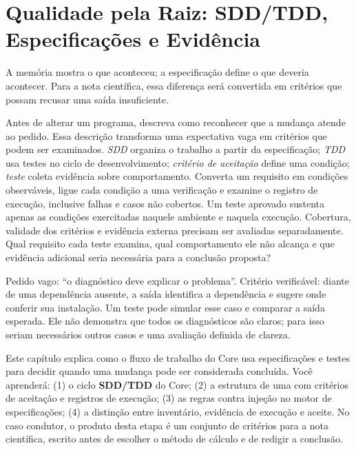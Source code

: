 \thispagestyle{fancy}
\chapter{Qualidade pela Raiz: SDD/TDD, Especificações e Evidência}

A memória mostra o que aconteceu; a especificação define o que deveria acontecer. Para a nota científica, essa diferença será convertida em critérios que possam recusar uma saída insuficiente.


\roteirodidatico
{Antes de alterar um programa, descreva como reconhecer que a mudança atende ao pedido. Essa descrição transforma uma expectativa vaga em critérios que podem ser examinados.}
{\emph{SDD} organiza o trabalho a partir da especificação; \emph{TDD} usa testes no ciclo de desenvolvimento; \emph{critério de aceitação} define uma condição; \emph{teste} coleta evidência sobre comportamento.}
{Converta um requisito em condições observáveis, ligue cada condição a uma verificação e examine o registro de execução, inclusive falhas e casos não cobertos.}
{Um teste aprovado sustenta apenas as condições exercitadas naquele ambiente e naquela execução. Cobertura, validade dos critérios e evidência externa precisam ser avaliadas separadamente.}
{Qual requisito cada teste examina, qual comportamento ele não alcança e que evidência adicional seria necessária para a conclusão proposta?}

{Pedido vago: ``o diagnóstico deve explicar o problema''. Critério verificável: diante de uma dependência ausente, a saída identifica a dependência e sugere onde conferir sua instalação. Um teste pode simular esse caso e comparar a saída esperada. Ele não demonstra que todos os diagnósticos são claros; para isso seriam necessários outros casos e uma avaliação definida de clareza.}

\begin{resultado}
Este capítulo explica como o fluxo de trabalho do Core usa especificações e
testes para decidir quando uma mudança pode ser considerada concluída.
Você aprenderá: (1) o ciclo \textbf{SDD/TDD} do Core; (2) a estrutura de uma
 com critérios de aceitação e registros de execução; (3) as
regras contra injeção no motor de especificações; (4) a distinção entre
inventário, evidência de execução e aceite. No caso condutor, o produto desta
etapa é um conjunto de critérios para a nota científica, escrito antes de
escolher o método de cálculo e de redigir a conclusão.
\end{resultado}


